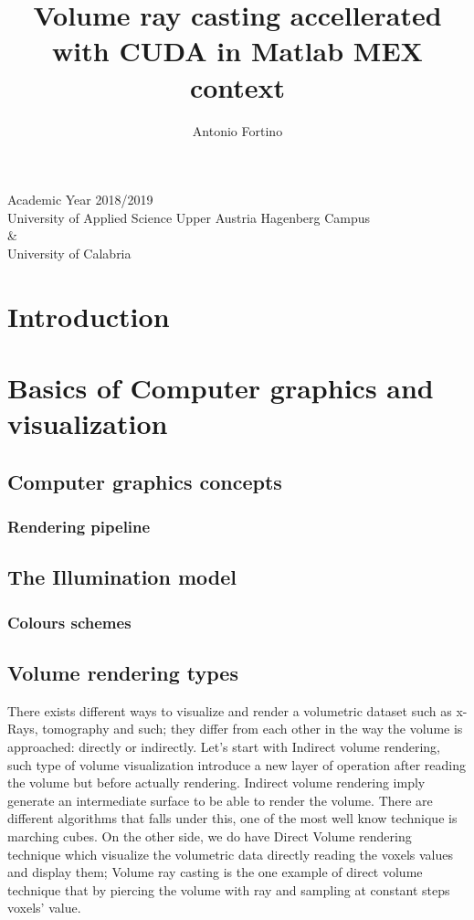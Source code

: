 \documentclass[10pt,a4paper]{article}
\author{Antonio Fortino}
\title{Volume ray casting accellerated with CUDA in Matlab MEX context}
\begin{document}
\maketitle
\begin{center}
Academic Year 2018/2019\\
University of Applied Science Upper Austria Hagenberg Campus\\
\&\\
University of Calabria
\end{center}
\pagebreak
\tableofcontents
\pagebreak
\section{Introduction}

\section{Basics of Computer graphics and visualization}
\subsection{Computer graphics concepts}
\subsubsection{Rendering pipeline}
\subsection{The Illumination model}
\subsubsection{Colours schemes}
\subsection{Volume rendering types}
There exists different ways to visualize and render a volumetric dataset such as x-Rays, tomography and such; they differ from each other in the way the volume is approached: directly or indirectly.
Let's start with Indirect volume rendering, such type of volume visualization introduce a new layer of operation after reading the volume but before actually rendering. Indirect volume rendering imply generate an intermediate surface to be able to render the volume. There are different algorithms that falls under this, one of the most well know technique is marching cubes.
On the other side, we do have Direct Volume rendering technique which visualize the volumetric data directly reading the voxels values and display them; Volume ray casting is the one example of direct volume technique that by piercing the volume with ray and sampling at constant steps voxels' value.
\end{document}
